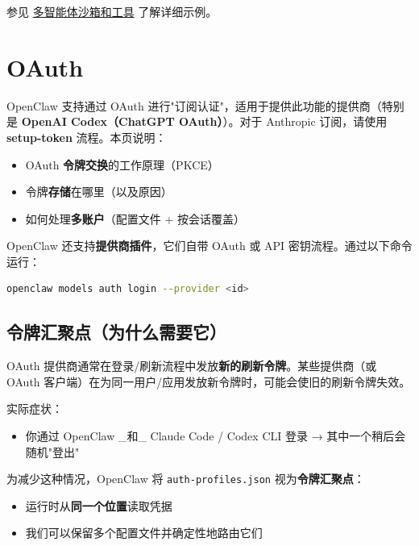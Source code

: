 参见 \href{/tools/multi-agent-sandbox-tools}{多智能体沙箱和工具} 了解详细示例。


\clearpage

\section{OAuth}


OpenClaw 支持通过 OAuth 进行"订阅认证"，适用于提供此功能的提供商（特别是 \textbf{OpenAI Codex（ChatGPT OAuth）}）。对于 Anthropic 订阅，请使用 \textbf{setup-token} 流程。本页说明：

\begin{itemize}
  \item OAuth \textbf{令牌交换}的工作原理（PKCE）
  \item 令牌\textbf{存储}在哪里（以及原因）
  \item 如何处理\textbf{多账户}（配置文件 + 按会话覆盖）
\end{itemize}


OpenClaw 还支持\textbf{提供商插件}，它们自带 OAuth 或 API 密钥流程。通过以下命令运行：

\begin{lstlisting}[language=bash]
openclaw models auth login --provider <id>
\end{lstlisting}


\subsection{令牌汇聚点（为什么需要它）}


OAuth 提供商通常在登录/刷新流程中发放\textbf{新的刷新令牌}。某些提供商（或 OAuth 客户端）在为同一用户/应用发放新令牌时，可能会使旧的刷新令牌失效。

实际症状：

\begin{itemize}
  \item 你通过 OpenClaw \_和\_ Claude Code / Codex CLI 登录 → 其中一个稍后会随机"登出"
\end{itemize}


为减少这种情况，OpenClaw 将 \texttt{auth-profiles.json} 视为\textbf{令牌汇聚点}：

\begin{itemize}
  \item 运行时从\textbf{同一个位置}读取凭据
  \item 我们可以保留多个配置文件并确定性地路由它们
\end{itemize}



